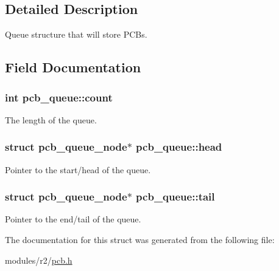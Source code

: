 \subsection{Detailed Description}
Queue structure that will store P\+C\+Bs. 

\subsection{Field Documentation}
\subsubsection[{\texorpdfstring{count}{count}}]{\setlength{\rightskip}{0pt plus 5cm}int pcb\+\_\+queue\+::count}\hypertarget{structpcb__queue_a04e6c9d91e324b1f6cbc8bfd771bafb1}{}\label{structpcb__queue_a04e6c9d91e324b1f6cbc8bfd771bafb1}


The length of the queue. 

\subsubsection[{\texorpdfstring{head}{head}}]{\setlength{\rightskip}{0pt plus 5cm}struct {\bf pcb\+\_\+queue\+\_\+node}$\ast$ pcb\+\_\+queue\+::head}\hypertarget{structpcb__queue_a183818f26c833aa30aefac583db68388}{}\label{structpcb__queue_a183818f26c833aa30aefac583db68388}


Pointer to the start/head of the queue. 

\subsubsection[{\texorpdfstring{tail}{tail}}]{\setlength{\rightskip}{0pt plus 5cm}struct {\bf pcb\+\_\+queue\+\_\+node}$\ast$ pcb\+\_\+queue\+::tail}\hypertarget{structpcb__queue_a54ed164636944248130e7032b7786cb3}{}\label{structpcb__queue_a54ed164636944248130e7032b7786cb3}


Pointer to the end/tail of the queue. 



The documentation for this struct was generated from the following file\+:\begin{DoxyCompactItemize}
\item 
modules/r2/\hyperlink{pcb_8h}{pcb.\+h}\end{DoxyCompactItemize}

